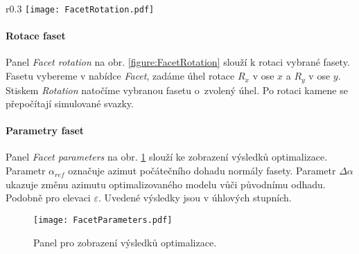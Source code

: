\newpage

\begin{wrapfigure}[6]{r}{0.3\textwidth}
\centering
\texttt{[image: FacetRotation.pdf]}
	
\caption{Panel pro změnu sklonu normál faset. }
\label{figure:FacetRotation}
\end{wrapfigure}

\paragraph{Rotace faset}
\hspace{1mm}
\vspace{2mm}

Panel \textit{Facet rotation} na obr. \ref{figure:FacetRotation} slouží k rotaci vybrané fasety. Fasetu vybereme v nabídce \textit{Facet}, zadáme úhel rotace \textit{$R_x$} v ose $x$ a \textit{$R_y$} v ose $y$. Stiskem \textit{Rotation} natočíme vybranou fasetu o~zvolený úhel. Po rotaci kamene se přepočítají simulované svazky.  
 
 \vspace{3cm}

\paragraph{Parametry faset}
\hspace{1mm}
\vspace{2mm}

Panel \textit{Facet parameters} na obr. \ref{figure:FacetParameters} slouží ke zobrazení výsledků optimalizace. Parametr $\alpha_{ref}$ označuje azimut počátečního dohadu normály fasety. Parametr $\Delta\alpha$ ukazuje změnu azimutu optimalizovaného modelu vůči původnímu odhadu. Podobně pro elevaci  $\varepsilon$. Uvedené výsledky jsou v úhlových stupních. 
 
\begin{figure}[h!]
\centering
\texttt{[image: FacetParameters.pdf]}
	
\caption{Panel pro zobrazení výsledků optimalizace.}
\label{figure:FacetParameters}
\end{figure}
 


  
\clearpage